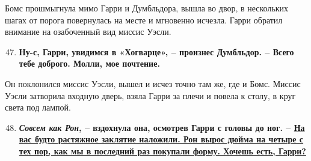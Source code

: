 \documentclass[12pt]{article}
\begin{document}
\begin{flushleft}
{\begin{minipage}[0]{540pt}
\vspace*{-10pt}
\hspace{3mm}Бомс прошмыгнула мимо Гарри и Думбльдора, вышла во двор, в нескольких шагах от порога повернулась на месте и мгновенно исчезла. Гарри обратил внимание на озабоченный вид миссис Уэсли.
\begin{enumerate}
\setcounter{enumi}{46}
\vspace*{-10pt}\item
\textbf{Ну-с, Гарри, увидимся в «Хогварце», \textnormal{– произнес Думбльдор. –} Всего тебе доброго. Молли, мое почтение.}
\end{enumerate}
\vspace*{-10pt}
\hspace{3mm}Он поклонился миссис Уэсли, вышел и исчез точно там же, где и Бомс. Миссис Уэсли затворила входную дверь, взяла Гарри за плечи и повела к столу, в круг света под лампой.
\begin{enumerate}
\setcounter{enumi}{47}
\vspace*{-10pt}\item
\textbf{\textit{Совсем как Рон}, \textnormal{– вздохнула она, осмотрев Гарри с головы до ног. –} \uline{На вас будто  растяжное заклятие наложили. Рон вырос дюйма на четыре с тех пор, как мы в последний раз покупали форму. Хочешь есть, Гарри?}}



\end{enumerate}
\end{minipage}}
\end{flushleft}
\end{document}
